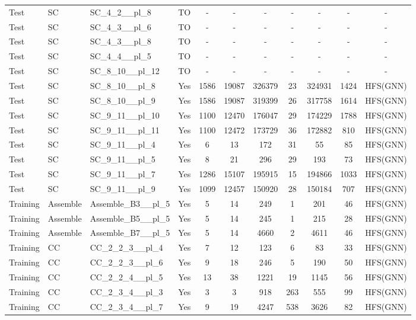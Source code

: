 \documentclass{article}
\begin{document}
\begin{tabular}{lllcccccccc}
Test & SC & SC\_4\_2\_\_pl\_8 & TO & - & - & - & - & - & - & - \\
Test & SC & SC\_4\_3\_\_pl\_6 & TO & - & - & - & - & - & - & - \\
Test & SC & SC\_4\_3\_\_pl\_8 & TO & - & - & - & - & - & - & - \\
Test & SC & SC\_4\_4\_\_pl\_5 & TO & - & - & - & - & - & - & - \\
Test & SC & SC\_8\_10\_\_pl\_12 & TO & - & - & - & - & - & - & - \\
Test & SC & SC\_8\_10\_\_pl\_8 & Yes & 1586 & 19087 & 326379 & 23 & 324931 & 1424 & HFS(GNN) \\
Test & SC & SC\_8\_10\_\_pl\_9 & Yes & 1586 & 19087 & 319399 & 26 & 317758 & 1614 & HFS(GNN) \\
Test & SC & SC\_9\_11\_\_pl\_10 & Yes & 1100 & 12470 & 176047 & 29 & 174229 & 1788 & HFS(GNN) \\
Test & SC & SC\_9\_11\_\_pl\_11 & Yes & 1100 & 12472 & 173729 & 36 & 172882 & 810 & HFS(GNN) \\
Test & SC & SC\_9\_11\_\_pl\_4 & Yes & 6 & 13 & 172 & 31 & 55 & 85 & HFS(GNN) \\
Test & SC & SC\_9\_11\_\_pl\_5 & Yes & 8 & 21 & 296 & 29 & 193 & 73 & HFS(GNN) \\
Test & SC & SC\_9\_11\_\_pl\_7 & Yes & 1286 & 15107 & 195915 & 15 & 194866 & 1033 & HFS(GNN) \\
Test & SC & SC\_9\_11\_\_pl\_9 & Yes & 1099 & 12457 & 150920 & 28 & 150184 & 707 & HFS(GNN) \\
Training & Assemble & Assemble\_B3\_\_pl\_5 & Yes & 5 & 14 & 249 & 1 & 201 & 46 & HFS(GNN) \\
Training & Assemble & Assemble\_B5\_\_pl\_5 & Yes & 5 & 14 & 245 & 1 & 215 & 28 & HFS(GNN) \\
Training & Assemble & Assemble\_B7\_\_pl\_5 & Yes & 5 & 14 & 4660 & 2 & 4611 & 46 & HFS(GNN) \\
Training & CC & CC\_2\_2\_3\_\_pl\_4 & Yes & 7 & 12 & 123 & 6 & 83 & 33 & HFS(GNN) \\
Training & CC & CC\_2\_2\_3\_\_pl\_6 & Yes & 9 & 18 & 246 & 5 & 190 & 50 & HFS(GNN) \\
Training & CC & CC\_2\_2\_4\_\_pl\_5 & Yes & 13 & 38 & 1221 & 19 & 1145 & 56 & HFS(GNN) \\
Training & CC & CC\_2\_3\_4\_\_pl\_3 & Yes & 3 & 3 & 918 & 263 & 555 & 99 & HFS(GNN) \\
Training & CC & CC\_2\_3\_4\_\_pl\_7 & Yes & 9 & 19 & 4247 & 538 & 3626 & 82 & HFS(GNN) \\

\end{tabular}
\end{document}
